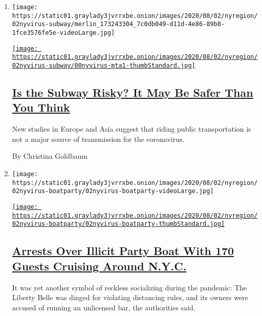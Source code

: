 \begin{enumerate}
\def\labelenumi{\arabic{enumi}.}
\item
  \texttt{[image: https://static01.graylady3jvrrxbe.onion/images/2020/08/02/nyregion/02nyvirus-subway/merlin\_173243304\_7c0db049-d11d-4e86-89b8-1fce3576fe5e-videoLarge.jpg]}

  \href{/2020/08/02/nyregion/nyc-subway-coronavirus-safety.html}{\texttt{[image: https://static01.graylady3jvrrxbe.onion/images/2020/08/02/nyregion/02nyvirus-subway/00nyvirus-mta1-thumbStandard.jpg]}}

  \hypertarget{is-the-subway-risky-it-may-be-safer-than-you-think}{%
  \subsection{\texorpdfstring{\href{/2020/08/02/nyregion/nyc-subway-coronavirus-safety.html}{Is
  the Subway Risky? It May Be Safer Than You
  Think}}{Is the Subway Risky? It May Be Safer Than You Think}}\label{is-the-subway-risky-it-may-be-safer-than-you-think}}

  New studies in Europe and Asia suggest that riding public
  transportation is not a major source of transmission for the
  coronavirus.

  By Christina Goldbaum
\item
  \texttt{[image: https://static01.graylady3jvrrxbe.onion/images/2020/08/02/nyregion/02nyvirus-boatparty/02nyvirus-boatparty-videoLarge.jpg]}

  \href{/2020/08/02/nyregion/liberty-belle-illegal-party.html}{\texttt{[image: https://static01.graylady3jvrrxbe.onion/images/2020/08/02/nyregion/02nyvirus-boatparty/02nyvirus-boatparty-thumbStandard.jpg]}}

  \hypertarget{arrests-over-illicit-party-boat-with-170-guests-cruising-around-nyc}{%
  \subsection{\texorpdfstring{\href{/2020/08/02/nyregion/liberty-belle-illegal-party.html}{Arrests
  Over Illicit Party Boat With 170 Guests Cruising Around
  N.Y.C.}}{Arrests Over Illicit Party Boat With 170 Guests Cruising Around N.Y.C.}}\label{arrests-over-illicit-party-boat-with-170-guests-cruising-around-nyc}}

  It was yet another symbol of reckless socializing during the pandemic:
  The Liberty Belle was dinged for violating distancing rules, and its
  owners were accused of running an unlicensed bar, the authorities
  said.


\end{enumerate}
